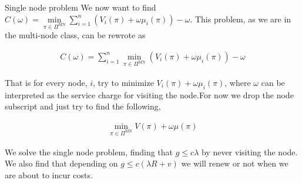 \documentclass[10pt]{beamer}
\begin{document}
%
%
%
%

\begin{frame}{Single node problem}
We now want to find $C(\omega)=\min\limits_{\pi \in \Pi^{\text{MN}}} \sum\limits_{i=1}^{n} (V_{i}(\pi)+\omega \mu_{i}(\pi)) - \omega$. This problem, as we are in the multi-node class, can be rewrote as

\begin{align*}
C(\omega)=\sum\limits_{i=1}^{n} \min\limits_{\pi \in \Pi^{\text{MN}}} (V_{i}(\pi)+\omega \mu_{i}(\pi)) - \omega
\end{align*}


That is for every node, $i$, try to minimize $V_{i}(\pi)+\omega \mu_{i}(\pi)$, where $\omega$ can be interpreted as the service charge for visiting the node.For now we drop the node subscript and just try to find the following,

\begin{align*}
\min_{\pi \in \Pi^{\text{MN}}} V(\pi) + \omega \mu(\pi)
\end{align*}

We solve the single node problem, finding that $g \leq c \lambda$ by never visiting the node. We also find that depending on $g \leq c (\lambda R + v)$ we will renew or not when we are about to incur costs.

\end{frame}
\end{document}
